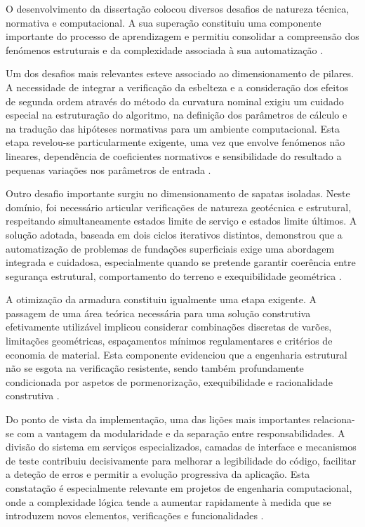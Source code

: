 O desenvolvimento da dissertação colocou diversos desafios de natureza técnica, normativa e computacional. A sua superação constituiu uma componente importante do processo de aprendizagem e permitiu consolidar a compreensão dos fenómenos estruturais e da complexidade associada à sua automatização \cite{EN1992,PythonDocs}.

Um dos desafios mais relevantes esteve associado ao dimensionamento de pilares. A necessidade de integrar a verificação da esbelteza e a consideração dos efeitos de segunda ordem através do método da curvatura nominal exigiu um cuidado especial na estruturação do algoritmo, na definição dos parâmetros de cálculo e na tradução das hipóteses normativas para um ambiente computacional. Esta etapa revelou-se particularmente exigente, uma vez que envolve fenómenos não lineares, dependência de coeficientes normativos e sensibilidade do resultado a pequenas variações nos parâmetros de entrada \cite{EN1992,Appleton,Goodchild}.

Outro desafio importante surgiu no dimensionamento de sapatas isoladas. Neste domínio, foi necessário articular verificações de natureza geotécnica e estrutural, respeitando simultaneamente estados limite de serviço e estados limite últimos. A solução adotada, baseada em dois ciclos iterativos distintos, demonstrou que a automatização de problemas de fundações superficiais exige uma abordagem integrada e cuidadosa, especialmente quando se pretende garantir coerência entre segurança estrutural, comportamento do terreno e exequibilidade geométrica \cite{Mosley,EN1992}.

A otimização da armadura constituiu igualmente uma etapa exigente. A passagem de uma área teórica necessária para uma solução construtiva efetivamente utilizável implicou considerar combinações discretas de varões, limitações geométricas, espaçamentos mínimos regulamentares e critérios de economia de material. Esta componente evidenciou que a engenharia estrutural não se esgota na verificação resistente, sendo também profundamente condicionada por aspetos de pormenorização, exequibilidade e racionalidade construtiva \cite{EN1992,AppletonGomes,LNECGuias}.

Do ponto de vista da implementação, uma das lições mais importantes relaciona-se com a vantagem da modularidade e da separação entre responsabilidades. A divisão do sistema em serviços especializados, camadas de interface e mecanismos de teste contribuiu decisivamente para melhorar a legibilidade do código, facilitar a deteção de erros e permitir a evolução progressiva da aplicação. Esta constatação é especialmente relevante em projetos de engenharia computacional, onde a complexidade lógica tende a aumentar rapidamente à medida que se introduzem novos elementos, verificações e funcionalidades \cite{DjangoDocs,PythonDocs}.

